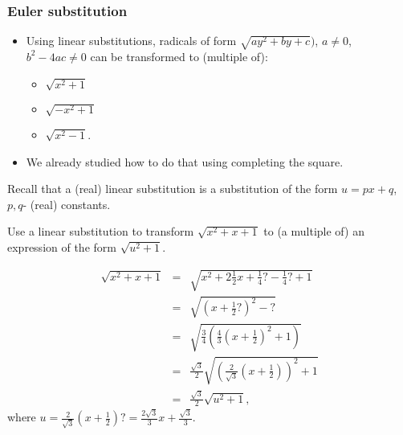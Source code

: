 \begin{frame}
\frametitle{Euler substitution}
\begin{itemize}
\item Using linear substitutions, radicals of form  $\sqrt{ay^2+by+c})$, $a\neq 0$, $b^2-4ac\neq 0$ can be transformed to (multiple of):
\begin{itemize}
\item $\sqrt{x^2+1}$ 
\item $\sqrt{-x^2+1}$
\item $\sqrt{x^2-1}$.
\end{itemize}
\item We already studied how to do that using completing the square. 
\end{itemize}
\end{frame}
\begin{frame}
Recall that a (real) linear substitution is a substitution of the form $u=px+q$, $p,q$- (real) constants.
\begin{example}
Use a linear substitution to transform $\sqrt{x^2+x+1}$ to (a multiple of) an expression of the form $\sqrt{u^2+1}$. 

\[
\begin{array}{rcl}
\sqrt{x^2+x+1}&=&\sqrt{ x^2+2\frac{1}{2}x +\frac{1}{4}\textbf{?}-\frac{1}{4}\textbf{?} +1} \\
&=& \sqrt{ \left(x+\frac{1}{2}\textbf{?} \right)^2-\textbf{?} }\\
&=&\sqrt{\frac{3}{4}\left( \frac{4}{3} \left(x+\frac{1}{2}\right)^2+1 \right)}\\
&=&\frac{\sqrt{3}}{2}\sqrt{\left(\frac{2}{\sqrt{3}}\left( x+\frac{1}{2}\right)\right)^2+1}\\
&=& \frac{\sqrt{3}}{2} \sqrt{u^2+1},
\end{array}
\]
where $u=\frac{2}{\sqrt{3}}\left( x+\frac{1}{2}\right) \textbf{?}=\frac{2\sqrt{3}}{3}x+\frac{\sqrt{3}}{3}$.
\end{example}
\vspace{5cm}
\end{frame}
